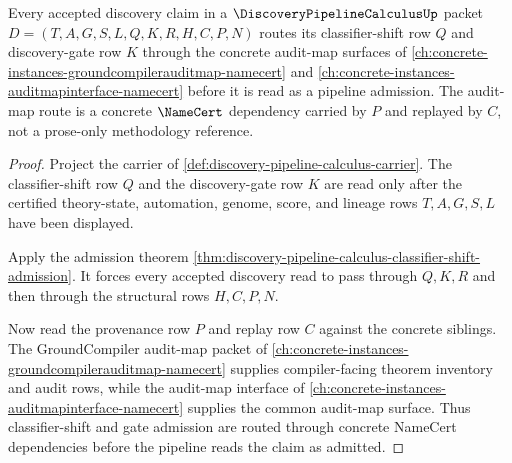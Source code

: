 \begin{theorem}
\label{thm:discovery-pipeline-calculus-audit-map-route}
Every accepted discovery claim in a $\DiscoveryPipelineCalculusUp$ packet $D=(T,A,G,S,L,Q,K,R,H,C,P,N)$ routes its classifier-shift row $Q$ and discovery-gate row $K$ through the concrete audit-map surfaces of \autoref{ch:concrete-instances-groundcompilerauditmap-namecert} and \autoref{ch:concrete-instances-auditmapinterface-namecert} before it is read as a pipeline admission. The audit-map route is a concrete $\NameCert$ dependency carried by $P$ and replayed by $C$, not a prose-only methodology reference.
\end{theorem}
\begin{proof}
Project the carrier of \autoref{def:discovery-pipeline-calculus-carrier}. The classifier-shift row $Q$ and the discovery-gate row $K$ are read only after the certified theory-state, automation, genome, score, and lineage rows $T,A,G,S,L$ have been displayed.

Apply the admission theorem \autoref{thm:discovery-pipeline-calculus-classifier-shift-admission}. It forces every accepted discovery read to pass through $Q,K,R$ and then through the structural rows $H,C,P,N$.

Now read the provenance row $P$ and replay row $C$ against the concrete siblings. The GroundCompiler audit-map packet of \autoref{ch:concrete-instances-groundcompilerauditmap-namecert} supplies compiler-facing theorem inventory and audit rows, while the audit-map interface of \autoref{ch:concrete-instances-auditmapinterface-namecert} supplies the common audit-map surface. Thus classifier-shift and gate admission are routed through concrete NameCert dependencies before the pipeline reads the claim as admitted.
\end{proof}



